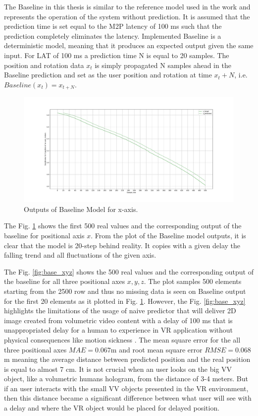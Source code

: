 The Baseline in this thesis is similar to the reference model used in the work \cite{serhan_kalman} and represents the operation of the system without prediction. It is assumed that the prediction time is set equal to the M2P latency of 100 ms such that the prediction completely eliminates the latency. Implemented Baseline is a deterministic model, meaning that it produces an expected output given the same input. For LAT of 100 ms a prediction time N is equal to 20 samples. The position and rotation data $x_t$ is simply propagated N samples ahead in the Baseline prediction and set as the user position and rotation at time $x_t + N$, i.e. $Baseline(x_t) = x_{t+N}$. 
\begin{figure}[htb]
	\begin{center}
		\includegraphics[width=1\textwidth, keepaspectratio]{gfx/base_zoom-x.pdf}
		\caption{\label{fig:base_x} Outputs of Baseline Model for x-axis.}
	\end{center}
\end{figure}

The Fig. \ref{fig:base_x} shows the first 500 real values and the corresponding output of the baseline for positional axis $x$. From the plot of the Baseline model outputs, it is clear that the model is 20-step behind reality. It copies with a given delay the falling trend and all fluctuations of the given axis.

The Fig. \ref{fig:base_xyz} shows the 500 real values and the corresponding output of the baseline for all three positional axes $x, y, z$. The plot samples 500 elements starting from the 2500 row and thus no missing data is seen on Baseline output for the first 20 elements as it plotted in Fig. \ref{fig:base_x}. However, the Fig. \ref{fig:base_xyz} highlights the limitations of the usage of naive predictor that will deliver 2D image created from volumetric video content with a delay of 100 ms that is unappropriated delay for a human to experience in VR application without physical consequences like motion sickness \cite{delay_sickness}. The mean square error for the all three positional axes $MAE = 0.067$m and root mean square error  $RMSE = 0.068$m meaning the average distance between predicted position and the real position is equal to almost 7 cm. It is not crucial when an user looks on the big VV object, like a volumetric humans hologram, from the distance of 3-4 meters. But if an user interacts with the small VV objects presented in the VR environment, then this distance became a significant difference between what user will see with a delay and where the VR object would be placed for delayed position. 

